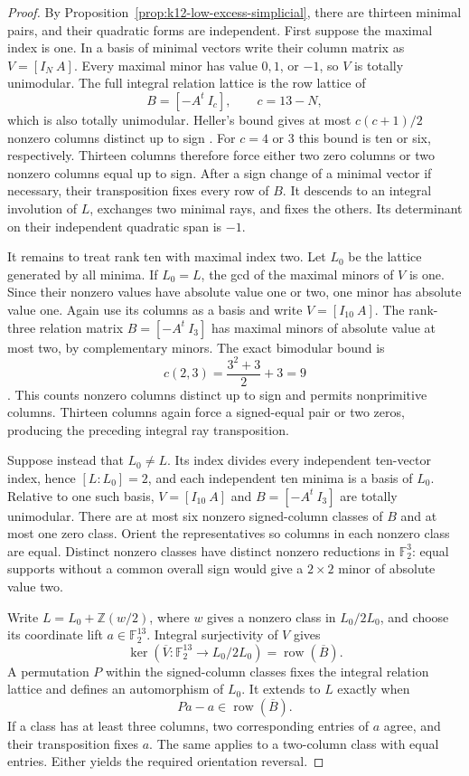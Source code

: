 \documentclass[11pt,a4paper]{article}
\theoremstyle{definition}
\begin{document}
\begin{proof}
By Proposition~\ref{prop:k12-low-excess-simplicial}, there are thirteen
minimal pairs, and their quadratic forms are independent. First suppose
the maximal index is one. In a basis of minimal vectors write their
column matrix as $V=[I_N\ A]$. Every maximal minor has value $0,1$,
or $-1$, so $V$ is totally unimodular. The full integral relation
lattice is the row lattice of
\[
 B=[-A^t\ I_c],\qquad c=13-N,
\]
which is also totally unimodular. Heller's bound gives at most
$c(c+1)/2$ nonzero columns distinct up to sign
\cite[Theorem~4.2, pp.~1358--1360]{Heller1957}.
For $c=4$ or $3$ this bound is ten or six, respectively.
Thirteen columns therefore force either two zero columns or two
nonzero columns equal up to sign. After a sign change of a minimal
vector if necessary, their transposition fixes every row of $B$.
It descends to an integral involution of $L$, exchanges two minimal
rays, and fixes the others. Its determinant on their independent
quadratic span is $-1$.

It remains to treat rank ten with maximal index two. Let $L_0$ be
the lattice generated by all minima. If $L_0=L$, the gcd of the
maximal minors of $V$ is one. Since their nonzero values have
absolute value one or two, one minor has absolute value one.
Again use its columns as a basis and write $V=[I_{10}\ A]$.
The rank-three relation matrix $B=[-A^t\ I_3]$ has maximal minors
of absolute value at most two, by complementary minors. The exact
bimodular bound is
\[
 c(2,3)=\frac{3^2+3}{2}+3=9
\]
\cite[Theorem~1, p.~4]{LeePaatStallknechtXu2022}.
This counts nonzero columns distinct up to sign and permits
nonprimitive columns. Thirteen columns again force a signed-equal
pair or two zeros, producing the preceding integral ray transposition.

Suppose instead that $L_0\ne L$. Its index divides every independent
ten-vector index, hence $[L:L_0]=2$, and each independent ten minima
is a basis of $L_0$. Relative to one such basis, $V=[I_{10}\ A]$
and $B=[-A^t\ I_3]$ are totally unimodular. There are at most six
nonzero signed-column classes of $B$ and at most one zero class.
Orient the representatives so columns in each nonzero class are equal.
Distinct nonzero classes have distinct nonzero reductions in
$\mathbb F_2^3$: equal supports without a common overall sign would
give a $2\times2$ minor of absolute value two.

Write $L=L_0+\mathbb Z(w/2)$, where $w$ gives a nonzero class in
$L_0/2L_0$, and choose its coordinate lift $a\in\mathbb F_2^{13}$.
Integral surjectivity of $V$ gives
\[
 \ker(\overline V:\mathbb F_2^{13}\longrightarrow L_0/2L_0)
 =\operatorname{row}(\overline B).
\]
A permutation $P$ within the signed-column classes fixes the integral
relation lattice and defines an automorphism of $L_0$. It extends to
$L$ exactly when
\[
 Pa-a\in\operatorname{row}(\overline B).
\]
If a class has at least three columns, two corresponding entries of
$a$ agree, and their transposition fixes $a$. The same applies to a
two-column class with equal entries. Either yields the required
orientation reversal.


\end{proof}
\end{document}

